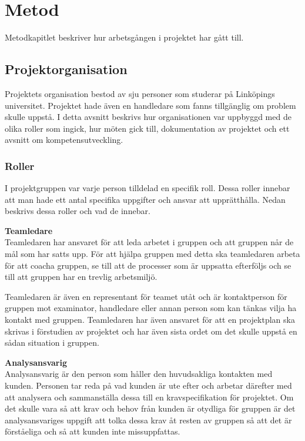 \chapter{Metod}
Metodkapitlet beskriver hur arbetsgången i projektet har gått till.

\section{Projektorganisation}
Projektets organisation bestod av sju personer som studerar på Linköpings universitet. Projektet hade även en handledare som fanns tillgänglig om problem skulle uppstå. I detta avsnitt beskrivs hur organisationen var uppbyggd med de olika roller som ingick, hur möten gick till, dokumentation av projektet och ett avsnitt om kompetensutveckling.

\subsection{Roller}
I projektgruppen var varje person tilldelad en specifik roll. Dessa roller innebar att man hade ett antal specifika uppgifter och ansvar att upprätthålla. Nedan beskrivs dessa roller och vad de innebar.

\textbf{Teamledare}\\
Teamledaren har ansvaret för att leda arbetet i gruppen och att gruppen når de mål som har satts upp. För att hjälpa gruppen med detta ska teamledaren arbeta för att coacha gruppen, se till att de processer som är uppsatta efterföljs och se till att gruppen har en trevlig arbetsmiljö.

Teamledaren är även en representant för teamet utåt och är kontaktperson för gruppen mot examinator, handledare eller annan person som kan tänkas vilja ha kontakt med gruppen. Teamledaren har även ansvaret för att en projektplan ska skrivas i förstudien av projektet och har även sista ordet om det skulle uppstå en sådan situation i gruppen.

\textbf{Analysansvarig}\\
Analysansvarig är den person som håller den huvudsakliga kontakten med kunden. Personen tar reda på
vad kunden är ute efter och arbetar därefter med att analysera och sammanställa dessa till en
kravspecifikation för projektet. Om det skulle vara så att krav och behov från kunden är otydliga för 
gruppen är det analysansvariges uppgift att tolka dessa krav åt resten av gruppen så att det är 
förståeliga och så att kunden inte missuppfattas.

